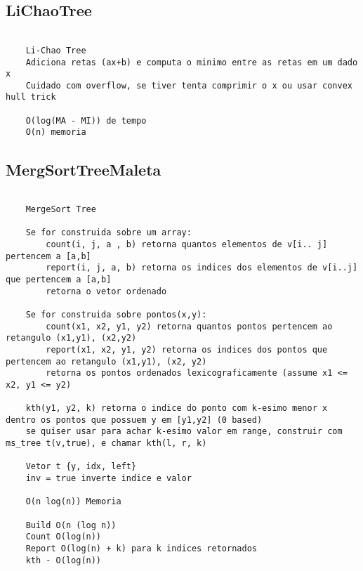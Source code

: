 \subsection{LiChaoTree}
\vspace{-4pt}
\begin{lstlisting}[style=description]

	Li-Chao Tree
	Adiciona retas (ax+b) e computa o minimo entre as retas em um dado x
	Cuidado com overflow, se tiver tenta comprimir o x ou usar convex hull trick

	O(log(MA - MI)) de tempo
	O(n) memoria

\end{lstlisting}
\vspace{-5pt}
\raggedbottom
\hrulefill

\vspace{-2pt}
\subsection{MergSortTreeMaleta}
\vspace{-4pt}
\begin{lstlisting}[style=description]

	MergeSort Tree

	Se for construida sobre um array:
		count(i, j, a , b) retorna quantos elementos de v[i.. j] pertencem a [a,b]
		report(i, j, a, b) retorna os indices dos elementos de v[i..j] que pertencem a [a,b]
		retorna o vetor ordenado

	Se for construida sobre pontos(x,y):
		count(x1, x2, y1, y2) retorna quantos pontos pertencem ao retangulo (x1,y1), (x2,y2)
		report(x1, x2, y1, y2) retorna os indices dos pontos que pertencem ao retangulo (x1,y1), (x2, y2)
		retorna os pontos ordenados lexicograficamente (assume x1 <= x2, y1 <= y2)

	kth(y1, y2, k) retorna o indice do ponto com k-esimo menor x dentro os pontos que possuem y em [y1,y2] (0 based)
	se quiser usar para achar k-esimo valor em range, construir com ms_tree t(v,true), e chamar kth(l, r, k)

	Vetor t {y, idx, left}
	inv = true inverte indice e valor

	O(n log(n)) Memoria

	Build O(n (log n))
	Count O(log(n))
	Report O(log(n) + k) para k indices retornados
	kth - O(log(n))


\end{lstlisting}
\vspace{-5pt}
\raggedbottom
\hrulefill

